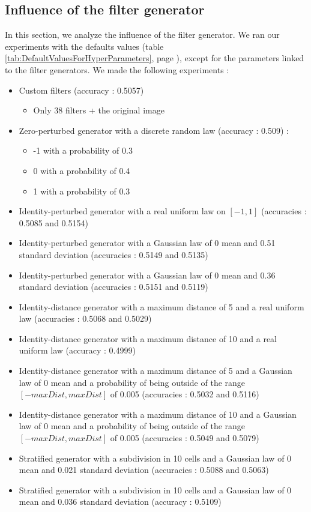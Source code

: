 \documentclass[a4paper]{report}
\begin{document}
	
	
		
	\subsection{Influence of the filter generator}
	In this section, we analyze the influence of the filter generator. We ran our experiments with the defaults values (table \ref{tab:DefaultValuesForHyperParameters}, page \pageref{tab:DefaultValuesForHyperParameters}), except for the parameters linked to the filter generators. We made the following experiments : 
	
	\begin{itemize}
		\item Custom filters (accuracy : 0.5057)
		\begin{itemize}
			\item Only 38 filters + the original image
		\end{itemize}
		\item Zero-perturbed generator with a discrete random law (accuracy : 0.509) :
		\begin{itemize}
			\item -1 with a probability of 0.3
			\item 0 with a probability of 0.4
			\item 1 with a probability of 0.3
		\end{itemize}
		\item Identity-perturbed generator with a real uniform law on $[-1, 1]$ (accuracies : 0.5085 and 	0.5154)
		\item Identity-perturbed generator with a Gaussian law of 0 mean and 0.51 standard deviation (accuracies : 0.5149 and 0.5135)
		\item Identity-perturbed generator with a Gaussian law of 0 mean and 0.36 standard deviation (accuracies : 0.5151 and 0.5119)
		\item Identity-distance generator with a maximum distance of 5 and a real uniform law (accuracies : 0.5068 and 0.5029)
		\item Identity-distance generator with a maximum distance of 10 and a real uniform law (accuracy : 0.4999)
		\item Identity-distance generator with a maximum distance of 5 and a Gaussian law of 0 mean and a probability of being outside of the range $[-maxDist, maxDist]$ of 0.005 (accuracies : 0.5032 and 0.5116)
		\item Identity-distance generator with a maximum distance of 10 and a Gaussian law of 0 mean and a probability of being outside of the range $[-maxDist, maxDist]$ of 0.005 (accuracies : 0.5049 and 0.5079)
		\item Stratified generator with a subdivision in 10 cells and a Gaussian law of 0 mean and 0.021 standard deviation (accuracies : 0.5088 and 0.5063)
		\item Stratified generator with a subdivision in 10 cells and a Gaussian law of 0 mean and 0.036 standard deviation (accuracy : 0.5109)
	\end{itemize}
	
\end{document}
